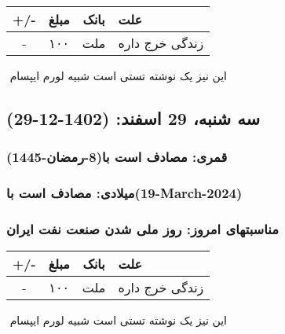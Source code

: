 \documentclass{article}
\newcommand{\rnote}[1]{\marginpar{\textcolor{color}{\StrSubstitute{\##1}{ }{\_}}}}
\newcommand{\myRow}[4]{
    #1 & #2 & #3 & #4 \\ \hline
}
\begin{document}
\begin{tabular}{ | c | c | c | p{5cm} |}
    \hline
    \myRow{ +/- }{مبلغ}{بانک}{علت}
    \myRow{-}{۱۰۰}{ملت}{زندگی خرج داره}
\end{tabular}
\newline
\newline

‌
\rnote{تست}
این نیز یک نوشته تستی است شبیه لورم ایپسام




\newpage
{}
\textcolor{color}{
\section{ سه شنبه، 29 اسفند: (1402-12-29) }
\subsubsection*{قمری: مصادف است با(8-رمضان-1445)} 
\subsubsection*{میلادی: مصادف است با(19-March-2024)}
\subsubsection*{مناسبتهای امروز: روز ملی شدن صنعت نفت ایران}
}


\begin{tabular}{ | c | c | c | p{5cm} |}
    \hline
    \myRow{ +/- }{مبلغ}{بانک}{علت}
    \myRow{-}{۱۰۰}{ملت}{زندگی خرج داره}
\end{tabular}
\newline
\newline

‌
\rnote{تست}
این نیز یک نوشته تستی است شبیه لورم ایپسام
\end{document}

